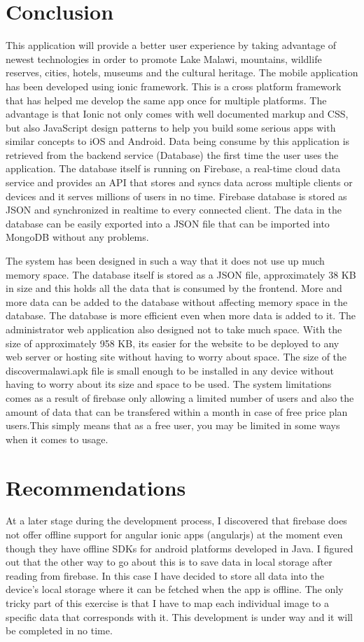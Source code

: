 \chapter{Conclusion}
This application will provide a better user experience by taking advantage of newest technologies in order to promote Lake Malawi, mountains, wildlife reserves, cities, hotels, museums and the cultural heritage.
The mobile application has been developed using ionic framework. This is a cross platform framework that has helped me develop the same app once for multiple platforms. The advantage is that Ionic not only comes with well documented markup and CSS, but also JavaScript design patterns to help you build some serious apps with similar concepts to iOS and Android.
Data being consume by this application is retrieved from the backend service (Database) the first time the user uses the application.
The database itself is running on Firebase, a real-time cloud data service and provides an API that stores and syncs data across multiple clients or devices and it serves millions of users in no time. Firebase database is stored as JSON and synchronized in realtime to every connected client. The data in the database can be easily exported into a JSON file that can be imported into MongoDB without any problems.

The system has been designed in such a way that it does not use up much memory space. The database itself is stored as a JSON file, approximately 38 KB in size and this holds all the data that is consumed by the frontend. More and more data can be added to the database without affecting memory space in the database. The database is more efficient even when more data is added to it. 
The administrator web application also designed not to take much space. With the size of approximately 958 KB, its easier for the website to be deployed to any web server or hosting site without having to worry about space. 
The size of the discovermalawi.apk file is small enough to be installed in any device without having to worry about its size and space to be used.
The system limitations comes as a result of firebase only allowing a limited number of users and also the amount of data that can be transfered within a month in case of free price plan users.This simply means that as a free user, you may be limited in some ways when it comes to usage. 

\chapter{Recommendations}
At a later stage during the development process, I discovered that firebase does not offer offline support for angular ionic apps (angularjs) at the moment even though they have offline SDKs for android platforms developed in Java. I figured out that the other way to go about this is to save data in local storage after reading from firebase. In this case I have decided to store all data into the device's local storage where it can be fetched when the app is offline. The only tricky part of this exercise is that I have to map each individual image to a specific data that corresponds with it. This development is under way and it will be completed in no time.

